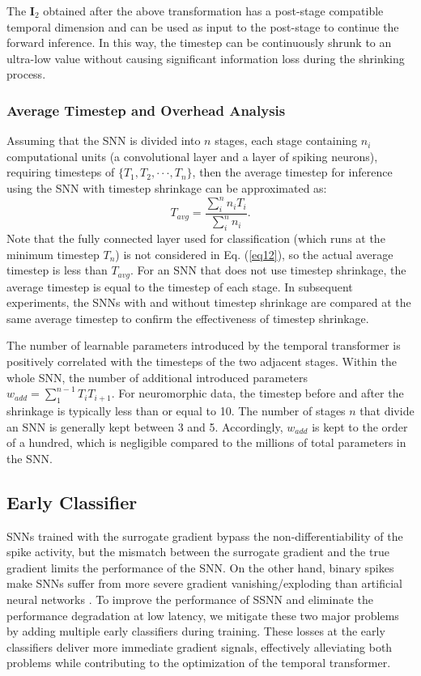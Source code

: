 \documentclass[letterpaper]{article} %
\begin{document}
The $\boldsymbol{I}_2$ obtained after the above transformation has a post-stage compatible temporal dimension and can be used as input to the post-stage to continue the forward inference. In this way, the timestep can be continuously shrunk to an ultra-low value without causing significant information loss during the shrinking process.

\subsubsection{Average Timestep and Overhead Analysis}
Assuming that the SNN is divided into $n$ stages, each stage containing $n_i$ computational units (a convolutional layer and a layer of spiking neurons), requiring timesteps of $\{T_1,T_2,\cdot\cdot\cdot,T_n\}$, then the average timestep for inference using the SNN with timestep shrinkage can be approximated as:
\begin{equation}
T_{avg}=\frac {\sum_i^n {n_iT_i}} {\sum_i^n n_i}.
\label{eq12}
\end{equation}
Note that the fully connected layer used for classification (which runs at the minimum timestep $T_n$) is not considered in Eq. (\ref{eq12}), so the actual average timestep is less than $T_{avg}$. For an SNN that does not use timestep shrinkage, the average timestep is equal to the timestep of each stage. In subsequent experiments, the SNNs with and without timestep shrinkage are compared at the same average timestep to confirm the effectiveness of timestep shrinkage.

The number of learnable parameters introduced by the temporal transformer is positively correlated with the timesteps of the two adjacent stages. Within the whole SNN, the number of additional introduced parameters $w_{add}=\sum_1^{n-1} {T_iT_{i+1}}$. For neuromorphic data, the timestep before and after the shrinkage is typically less than or equal to 10. The number of stages $n$ that divide an SNN is generally kept between 3 and 5. Accordingly, $w_{add}$ is kept to the order of a hundred, which is negligible compared to the millions of total parameters in the SNN.

\subsection{Early Classifier}

SNNs trained with the surrogate gradient bypass the non-differentiability of the spike activity, but the mismatch between the surrogate gradient and the true gradient limits the performance of the SNN. On the other hand, binary spikes make SNNs suffer from more severe gradient vanishing/exploding than artificial neural networks \cite{SEWResNet}. To improve the performance of SSNN and eliminate the performance degradation at low latency, we mitigate these two major problems by adding multiple early classifiers during training. These losses at the early classifiers deliver more immediate gradient signals, effectively alleviating both problems while contributing to the optimization of the temporal transformer.
\end{document}

